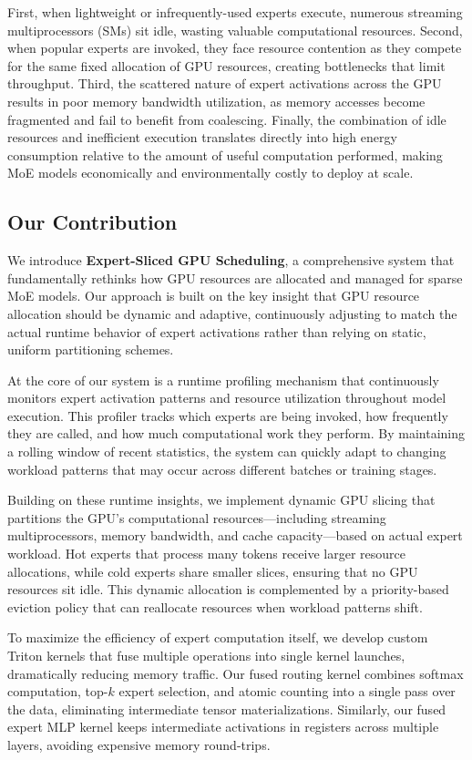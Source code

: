\documentclass{article}
\begin{document}
First, when lightweight or infrequently-used experts execute, numerous streaming multiprocessors (SMs) sit idle, wasting valuable computational resources. Second, when popular experts are invoked, they face resource contention as they compete for the same fixed allocation of GPU resources, creating bottlenecks that limit throughput. Third, the scattered nature of expert activations across the GPU results in poor memory bandwidth utilization, as memory accesses become fragmented and fail to benefit from coalescing. Finally, the combination of idle resources and inefficient execution translates directly into high energy consumption relative to the amount of useful computation performed, making MoE models economically and environmentally costly to deploy at scale.

\subsection{Our Contribution}

We introduce \textbf{Expert-Sliced GPU Scheduling}, a comprehensive system that fundamentally rethinks how GPU resources are allocated and managed for sparse MoE models. Our approach is built on the key insight that GPU resource allocation should be dynamic and adaptive, continuously adjusting to match the actual runtime behavior of expert activations rather than relying on static, uniform partitioning schemes.

At the core of our system is a runtime profiling mechanism that continuously monitors expert activation patterns and resource utilization throughout model execution. This profiler tracks which experts are being invoked, how frequently they are called, and how much computational work they perform. By maintaining a rolling window of recent statistics, the system can quickly adapt to changing workload patterns that may occur across different batches or training stages.

Building on these runtime insights, we implement dynamic GPU slicing that partitions the GPU's computational resources—including streaming multiprocessors, memory bandwidth, and cache capacity—based on actual expert workload. Hot experts that process many tokens receive larger resource allocations, while cold experts share smaller slices, ensuring that no GPU resources sit idle. This dynamic allocation is complemented by a priority-based eviction policy that can reallocate resources when workload patterns shift.

To maximize the efficiency of expert computation itself, we develop custom Triton kernels that fuse multiple operations into single kernel launches, dramatically reducing memory traffic. Our fused routing kernel combines softmax computation, top-$k$ expert selection, and atomic counting into a single pass over the data, eliminating intermediate tensor materializations. Similarly, our fused expert MLP kernel keeps intermediate activations in registers across multiple layers, avoiding expensive memory round-trips.
\end{document}
